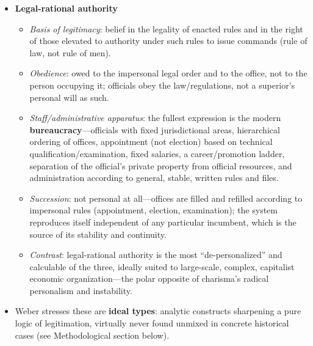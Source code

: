 \documentclass[12pt]{article}
\begin{document}
\begin{itemize}[leftmargin=*, itemsep=4pt]
\begin{itemize}
        \item \textit{Staff/administrative apparatus}: a following of disciples or a ``charismatic aristocracy''---chosen for their own charismatic qualification or personal devotion to the leader, not technical training, and not organized as a bureaucratic hierarchy with fixed salaries or career paths; administration is a ``calling'' rather than an office.
        \item \textit{Economic basis}: charismatic authority is deliberately \textbf{indifferent to (or actively rejects) economic considerations}---it is not a steady source of income, and disciples typically live by gifts, booty, or begging rather than fixed remuneration; it stands in radical opposition to routine, everyday economic life.
        \item \textit{Succession}: the great unsolved problem---charisma attaches to the person and does not automatically transfer; the death, incapacitation, or failure of the leader precipitates a crisis that can only be resolved via routinization (see below).
    \end{itemize}
    \item \textbf{Legal-rational authority}
    \begin{itemize}
        \item \textit{Basis of legitimacy}: belief in the legality of enacted rules and in the right of those elevated to authority under such rules to issue commands (rule of law, not rule of men).
        \item \textit{Obedience}: owed to the impersonal legal order and to the office, not to the person occupying it; officials obey the law/regulations, not a superior's personal will as such.
        \item \textit{Staff/administrative apparatus}: the fullest expression is the modern \textbf{bureaucracy}---officials with fixed jurisdictional areas, hierarchical ordering of offices, appointment (not election) based on technical qualification/examination, fixed salaries, a career/promotion ladder, separation of the official's private property from official resources, and administration according to general, stable, written rules and files.
        \item \textit{Succession}: not personal at all---offices are filled and refilled according to impersonal rules (appointment, election, examination); the system reproduces itself independent of any particular incumbent, which is the source of its stability and continuity.
        \item \textit{Contrast}: legal-rational authority is the most ``de-personalized'' and calculable of the three, ideally suited to large-scale, complex, capitalist economic organization---the polar opposite of charisma's radical personalism and instability.
    \end{itemize}
    \item Weber stresses these are \textbf{ideal types}: analytic constructs sharpening a pure logic of legitimation, virtually never found unmixed in concrete historical cases (see Methodological section below).
\end{itemize}
\end{document}
